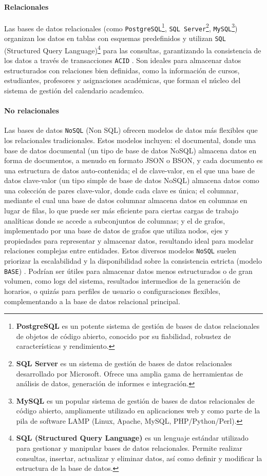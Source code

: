 \paragraph{Relacionales}
Las bases de datos relacionales (como \texttt{PostgreSQL}\footnote{\textbf{PostgreSQL} es un potente sistema de gestión de bases de datos relacionales de objetos de código abierto, conocido por su fiabilidad, robustez de características y rendimiento.}, \texttt{SQL Server}\footnote{\textbf{SQL Server} es un sistema de gestión de bases de datos relacionales desarrollado por Microsoft.
Ofrece una amplia gama de herramientas de análisis de datos, generación de informes e integración.}, \texttt{MySQL}\footnote{\textbf{MySQL} es un popular sistema de gestión de bases de datos relacionales de código abierto, ampliamente utilizado en aplicaciones web y como parte de la pila de software LAMP (Linux, Apache, MySQL, PHP/Python/Perl).}) organizan los datos en tablas con esquemas predefinidos y utilizan \texttt{SQL} (Structured Query Language)\footnote{\textbf{SQL (Structured Query Language)} es un lenguaje estándar utilizado para gestionar y manipular bases de datos relacionales.
Permite realizar consultas, insertar, actualizar y eliminar datos, así como definir y modificar la estructura de la base de datos.} para las consultas, garantizando la consistencia de los datos a través de transacciones \texttt{ACID} \parencite{Date2003}.
Son ideales para almacenar datos estructurados con relaciones bien definidas, como la información de cursos, estudiantes, profesores y asignaciones académicas, que forman el núcleo del sistema de gestión del calendario academíco.

\paragraph{No relacionales}
Las bases de datos \texttt{NoSQL} (Non SQL) ofrecen modelos de datos más flexibles que los relacionales tradicionales.
Estos modelos incluyen:
el documental, donde una base de datos documental (un tipo de base de datos NoSQL) almacena datos en forma de documentos, a menudo en formato JSON o BSON, y cada documento es una estructura de datos auto-contenida;
el de clave-valor, en el que una base de datos clave-valor (un tipo simple de base de datos NoSQL) almacena datos como una colección de pares clave-valor, donde cada clave es única;
el columnar, mediante el cual una base de datos columnar almacena datos en columnas en lugar de filas, lo que puede ser más eficiente para ciertas cargas de trabajo analíticas donde se accede a subconjuntos de columnas;
y el de grafos, implementado por una base de datos de grafos que utiliza nodos, ejes y propiedades para representar y almacenar datos, resultando ideal para modelar relaciones complejas entre entidades.
Estos diversos modelos \texttt{NoSQL} suelen priorizar la escalabilidad y la disponibilidad sobre la consistencia estricta (modelo \texttt{BASE}) \parencite{SadalegeFowler2012}.
Podrían ser útiles para almacenar datos menos estructurados o de gran volumen, como logs del sistema, resultados intermedios de la generación de horarios, o quizás para perfiles de usuario o configuraciones flexibles, complementando a la base de datos relacional principal.
